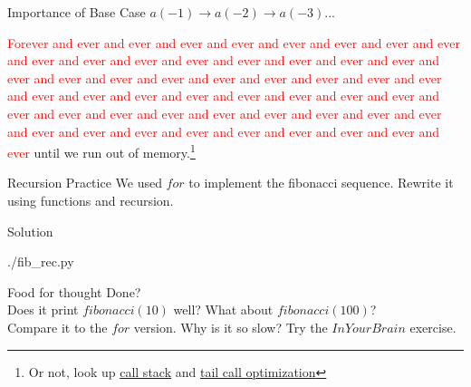 \documentclass{beamer}
\begin{document}
\begin{frame}{Importance of Base Case}
  $a(-1) \rightarrow a(-2) \rightarrow a(-3) ...$


  \textcolor{red}{Forever and ever and ever and ever and ever and ever and
  ever and ever and ever and ever and ever and ever and ever and ever and ever
  and ever and ever and ever and ever and ever and ever and ever and ever and
  ever and ever and ever and ever and ever and ever and ever and ever and ever
  and ever and ever and ever and ever and ever and ever and ever and ever and
  ever and ever and ever and ever and ever and ever and ever and ever and ever
  and ever and ever and ever}
  until we run out of memory.\footnote{Or not, look up
  \href{https://www.google.com/search?q=call+stack}{call stack} and
  \href{https://www.google.com/search?q=tail+call+optimization}{tail call
  optimization}}
\end{frame}

\begin{frame}{Recursion Practice}
  We used $for$ to implement the fibonacci sequence.
  Rewrite it using functions and recursion.\footnotemark[1]

\end{frame}

\begin{frame}{Solution}
  \begin{lstinputlisting}
    {./fib_rec.py}
  \end{lstinputlisting}
\end{frame}

\begin{frame}{Food for thought}
  Done?\\
  Does it print $fibonacci(10)$ well? What about $fibonacci(100)$?\\
  Compare it to the $for$ version. Why is it so slow? Try the $In Your Brain$
  exercise.
\end{frame}
\end{document}
